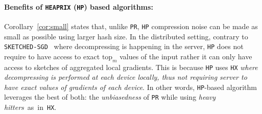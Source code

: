 \documentclass[sigconf, anonymous, review]{acmart}
\begin{document}
\paragraph{Benefits of \texttt{HEAPRIX} (\texttt{HP}) based algorithms:} Corollary~\ref{cor:small} states that, unlike \texttt{PR}, \texttt{HP} compression noise can be made as small as possible using larger hash size. 
In the distributed setting, contrary to \texttt{SKETCHED-SGD}~\citep{ivkin2019communication} where decompressing is happening in the server, \texttt{HP} does not require to have access to exact $\text{top}_m$ values of the input rather it can only have access to sketches of aggregated local gradients. This is because \texttt{HP} uses \texttt{HX} \emph{ where decompressing is performed at each device locally, thus not requiring server to have exact values of gradients of each device}.
In other words, \texttt{HP}-based algorithm leverages the best of both: the \emph{unbiasedness} of \texttt{PR} while using \emph{heavy hitters}~as~in~\texttt{HX}. 
\end{document}
